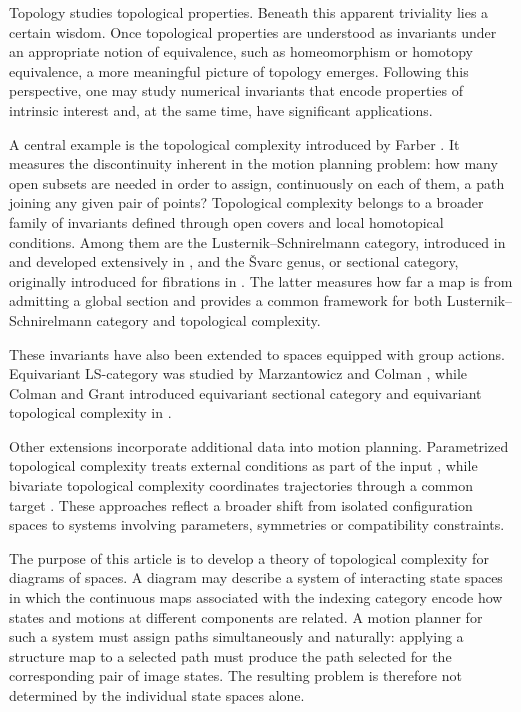 \documentclass[12pt]{amsart}
\theoremstyle{definition}
\theoremstyle{remark}
\numberwithin{figure}{section}%
\begin{document}
Topology studies topological properties. Beneath this apparent
triviality lies a certain wisdom. Once topological properties are
understood as invariants under an appropriate notion of equivalence,
such as homeomorphism or homotopy equivalence, a more meaningful
picture of topology emerges. Following this perspective, one may study
numerical invariants that encode properties of intrinsic interest and,
at the same time, have significant applications.

A central example is the topological complexity introduced by Farber
\cite{FARBER}. It measures the discontinuity inherent in the motion
planning problem: how many open subsets are needed in order to assign,
continuously on each of them, a path joining any given pair of points?
Topological complexity belongs to a broader family of invariants defined
through open covers and local homotopical conditions. Among them are the
Lusternik--Schnirelmann category, introduced in
\cite{LS-CATEGORY} and developed extensively in \cite{CLOT}, and the
\v{S}varc genus, or sectional category, originally introduced for
fibrations in \cite{Svarc}. The latter measures how far a map is from
admitting a global section and provides a common framework for both
Lusternik--Schnirelmann category and topological complexity.

These invariants have also been extended to spaces equipped with group
actions. Equivariant LS-category was studied by Marzantowicz
\cite{Marzantowwicz} and Colman \cite{Colman}, while Colman and Grant
introduced equivariant sectional category and equivariant topological
complexity in \cite{Grant-Colman-Equivariant}. 

Other extensions incorporate additional data into motion planning.
Parametrized topological complexity treats external conditions as part
of the input
\cite{CohenFarberWeinberger,FarberWeinberger}, while bivariate
topological complexity coordinates trajectories through a common target
\cite{GarciaCalcinesVilches}. These approaches reflect a broader shift
from isolated configuration spaces to systems involving parameters,
symmetries or compatibility constraints.

The purpose of this article is to develop a theory of topological
complexity for diagrams of spaces. A diagram may describe a system of
interacting state spaces in which the continuous maps associated with
the indexing category encode how states and motions at different
components are related. A motion planner for such a system must assign
paths simultaneously and naturally: applying a structure map to a
selected path must produce the path selected for the corresponding pair
of image states. The resulting problem is therefore not determined by
the individual state spaces alone.
\end{document}
